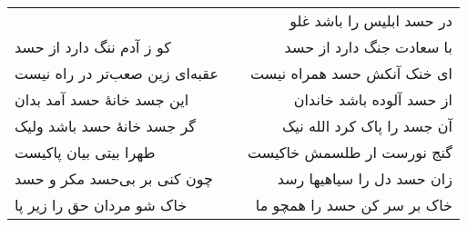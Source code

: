 \begin{center}
\begin{longtable}{l p{0.5cm} r}
&&
در حسد ابلیس را باشد غلو
\\
کو ز آدم ننگ دارد از حسد
&&
با سعادت جنگ دارد از حسد
\\
عقبه‌ای زین صعب‌تر در راه نیست
&&
ای خنک آنکش حسد همراه نیست
\\
این جسد خانهٔ حسد آمد بدان
&&
از حسد آلوده باشد خاندان
\\
گر جسد خانهٔ حسد باشد ولیک
&&
آن جسد را پاک کرد الله نیک
\\
طهرا بیتی بیان پاکیست
&&
گنج نورست ار طلسمش خاکیست
\\
چون کنی بر بی‌حسد مکر و حسد
&&
زان حسد دل را سیاهیها رسد
\\
خاک شو مردان حق را زیر پا
&&
خاک بر سر کن حسد را همچو ما
\\
\end{longtable}
\end{center}
